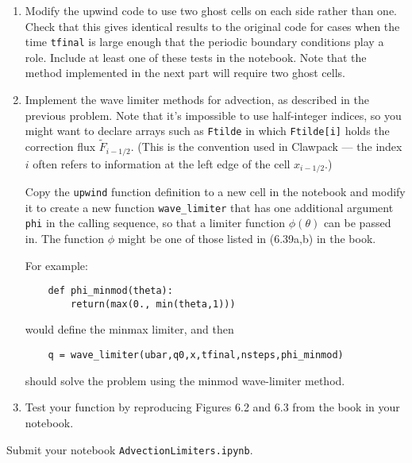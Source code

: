 \documentclass[11pt]{article}
\begin{document}
\renewcommand{\theenumi}{\alph{enumi}}  %
\begin{enumerate}
\item Modify the upwind code to use two ghost cells on each side rather than
one.  Check that this gives identical results to the original code for cases
when the time {\tt tfinal} is large enough that the periodic boundary
conditions play a role.  Include at least one of these tests in the notebook.
Note that the method implemented in the next part will require two ghost cells.

\item Implement the wave limiter methods for advection, as described in 
the previous problem.   Note that it's impossible to use half-integer
indices, so you might want to declare arrays such as \verb+Ftilde+ in which 
\verb+Ftilde[i]+ holds the correction flux $\widetilde F_{i-1/2}$.  (This is
the convention used in Clawpack --- the index $i$ often refers to
information at the left edge of the cell $x_{i-1/2}$.)

Copy the \verb+upwind+ function definition to a new cell in the notebook and
modify it to create a new function \verb+wave_limiter+ that has one
additional argument \verb+phi+ in the calling sequence, so that a limiter
function $\phi(\theta)$ can be passed in.  The function $\phi$ might be one
of those listed in (6.39a,b) in the book.  

For example:
\begin{verbatim}
    def phi_minmod(theta):
        return(max(0., min(theta,1)))
\end{verbatim}
would define the minmax limiter, and then
\begin{verbatim}
    q = wave_limiter(ubar,q0,x,tfinal,nsteps,phi_minmod)
\end{verbatim}
should solve the problem using the minmod wave-limiter method.

\item Test your function by reproducing
Figures 6.2 and 6.3 from the book in your notebook.

\end{enumerate} 

Submit your notebook \verb+AdvectionLimiters.ipynb+.
\end{document}

